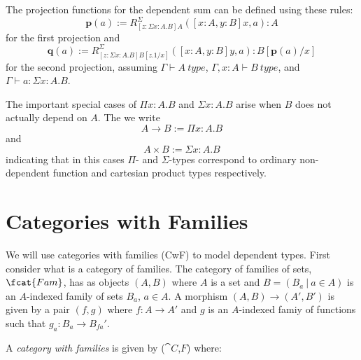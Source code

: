 The projection functions for the dependent sum can be defined using these
rules:
\[
  \mathbf{p}(a) := R^\Sigma_{[z : \Sigma x: A. B]A}([x : A, y: B]x, a) : A
\]
for the first projection and
\[
  \mathbf{q}(a) := R^\Sigma_{[z : \Sigma x: A. B]B[z.1/x]}([x : A, y: B]y, a) : B[\mathbf{p}(a)/x]
\]
for the second projection, assuming $\Gamma \vdash A~type$, $\Gamma, x:A \vdash
B~type$, and $\Gamma \vdash a : \Sigma x: A. B$.

The important special cases of $\Pi x: A. B$ and $\Sigma x : A. B$ arise when
$B$ does not actually depend on $A$. The we write
\[
  A \to B := \Pi x: A. B
\]
and
\[
  A \times B := \Sigma x: A. B
\]
indicating that in this cases $\Pi$- and $\Sigma$-types correspond to ordinary
non-dependent function and cartesian product types respectively.

\section*{Categories with Families}

We will use categories with families (CwF) to model dependent types. First
consider what is a category of families. The category of families of sets,
$\fcat{Fam}$, has as objects $(A, B)$ where $A$ is a set and $B = (B_a~|~a \in
A)$ is an $A$-indexed family of sets $B_a$, $a \in A$. A morphism $(A, B) \to
(A', B')$ is given by a pair $(f, g)$ where $f: A \to A'$ and $g$ is an
$A$-indexed famiy of functions such that $g_a: B_a \to B_{fa}'$.

A \emph{category with families} is given by ($\cat{C}$,$F$) where:

